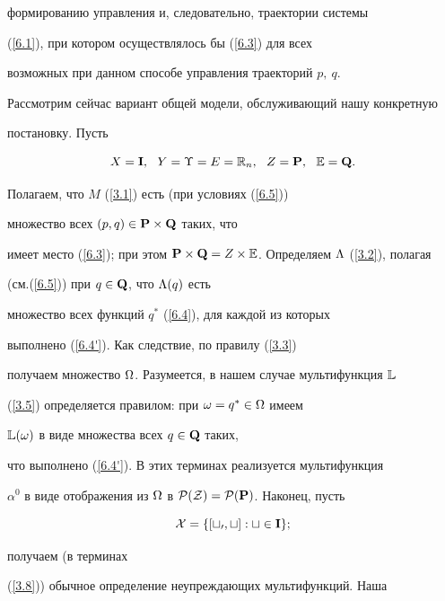 формированию управления и, следовательно, траектории системы


(\ref{6.1}), при котором осуществлялось бы (\ref{6.3}) для всех


возможных при данном способе управления траекторий $p,\ q$.





Рассмотрим сейчас вариант общей модели, обслуживающий нашу конкретную


постановку. Пусть


\begin{equation}\label{6.5}


X = \bold{I}, \ \ Y = \Upsilon = E = \Bbb{R}_n,\ \ Z = \bold{P},


\ \ \Bbb{E} = \bold{Q}.


\end{equation}


Полагаем, что $M$ (\ref{3.1}) есть (при условиях (\ref{6.5}))


множество всех $(p,q) \in \bold{P} \times \bold{Q}$ таких, что


имеет место (\ref{6.3}); при этом $ \bold{P} \times \bold{Q} = Z


\times \Bbb{E}$. Определяем $\Ld$ (\ref{3.2}), полагая


(см.(\ref{6.5})) при $q \in \bold{Q}$, что ${\Lambda}(q)$ есть


множество всех функций $q^*$ (\ref{6.4}), для каждой из которых


выполнено (\ref{6.4'}). Как следствие, по правилу (\ref{3.3})


получаем множество $\Omega$. Разумеется, в нашем случае мультифункция $\Bbb{L}$


(\ref{3.5}) определяется правилом: при $\omega = {q^*} \in \Omega$ имеем


$\Bbb{L}(\omega)$ в виде множества всех $q \in \bold{Q}$ таких,


что выполнено (\ref{6.4'}). В этих терминах реализуется мультифункция


${\alpha}^0$ в виде отображения из $\Om$ в $\cal{P}(Z) =


\cal{P}({\bold{P}})$. Наконец, пусть


$$


\cal{X} =\{[{t_0},t]:t \in \bold{I}\};


$$


получаем (в терминах


(\ref{3.8})) обычное определение неупреждающих мультифункций. Наша


